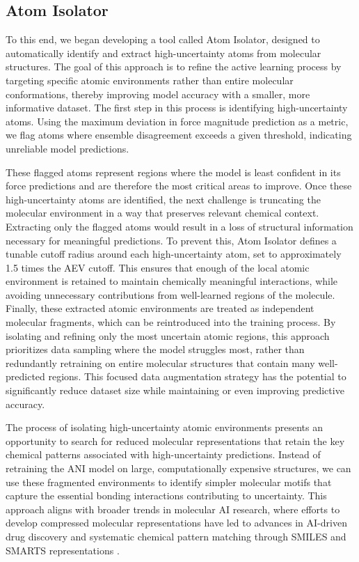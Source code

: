 \subsection{Atom Isolator}
\label{subsec:atom_isolator}

To this end, we began developing a tool called Atom Isolator, designed to automatically identify and extract high-uncertainty atoms from molecular structures. The goal of this approach is to refine the active learning process by targeting specific atomic environments rather than entire molecular conformations, thereby improving model accuracy with a smaller, more informative dataset. The first step in this process is identifying high-uncertainty atoms. Using the maximum deviation in force magnitude prediction as a metric, we flag atoms where ensemble disagreement exceeds a given threshold, indicating unreliable model predictions. 

These flagged atoms represent regions where the model is least confident in its force predictions and are therefore the most critical areas to improve. Once these high-uncertainty atoms are identified, the next challenge is truncating the molecular environment in a way that preserves relevant chemical context. Extracting only the flagged atoms would result in a loss of structural information necessary for meaningful predictions. To prevent this, Atom Isolator defines a tunable cutoff radius around each high-uncertainty atom, set to approximately 1.5 times the AEV cutoff. This ensures that enough of the local atomic environment is retained to maintain chemically meaningful interactions, while avoiding unnecessary contributions from well-learned regions of the molecule. Finally, these extracted atomic environments are treated as independent molecular fragments, which can be reintroduced into the training process. By isolating and refining only the most uncertain atomic regions, this approach prioritizes data sampling where the model struggles most, rather than redundantly retraining on entire molecular structures that contain many well-predicted regions. This focused data augmentation strategy has the potential to significantly reduce dataset size while maintaining or even improving predictive accuracy.

The process of isolating high-uncertainty atomic environments presents an opportunity to search for reduced molecular representations that retain the key chemical patterns associated with high-uncertainty predictions. Instead of retraining the ANI model on large, computationally expensive structures, we can use these fragmented environments to identify simpler molecular motifs that capture the essential bonding interactions contributing to uncertainty. This approach aligns with broader trends in molecular AI research, where efforts to develop compressed molecular representations have led to advances in AI-driven drug discovery \cite{mol_reps_in_AI_drug_discovery_david} and systematic chemical pattern matching through SMILES and SMARTS representations \cite{SMILES_pair_encoding_li, mol_patterns_SMARTS_schmidt, automated_fragment_gen_smiles_bilsland}.

